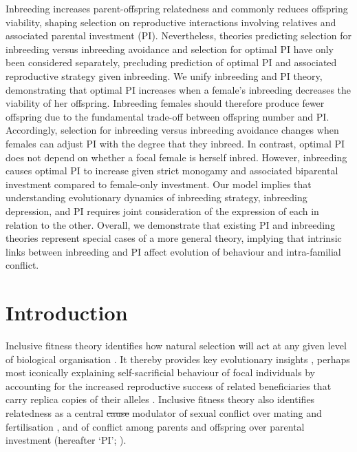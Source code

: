 \documentclass[12pt]{article}
\begin{document}
Inbreeding increases parent-offspring relatedness and commonly reduces offspring viability, shaping selection on reproductive interactions involving relatives and associated parental investment (PI). Nevertheless, theories predicting selection for inbreeding versus inbreeding avoidance and selection for optimal PI have only been considered separately, precluding prediction of optimal PI and associated reproductive strategy given inbreeding. We unify inbreeding and PI theory, demonstrating that optimal PI increases when a female's inbreeding decreases the viability of her offspring. Inbreeding females should therefore produce fewer offspring due to the fundamental trade-off between offspring number and PI. Accordingly, selection for inbreeding versus inbreeding avoidance changes when females can adjust PI with the degree that they inbreed. In contrast, optimal PI does not depend on whether a focal female is herself inbred. However, inbreeding causes optimal PI to increase given strict monogamy and associated biparental investment compared to female-only investment. Our model implies that understanding evolutionary dynamics of inbreeding strategy, inbreeding depression, and PI requires joint consideration of the expression of each in relation to the other. Overall, we demonstrate that existing PI and inbreeding theories represent special cases of a more general theory, implying that intrinsic links between inbreeding and PI affect evolution of behaviour and intra-familial conflict.

\section*{Introduction}

Inclusive fitness theory identifies how natural selection will act at any given level of biological organisation \cite[][]{Grafen2006}. It thereby provides key evolutionary insights \cite[][]{Fisher2013, Bourke2014, Gardner2014, Liao2015}, perhaps most iconically explaining self-sacrificial behaviour of focal individuals by accounting for the increased reproductive success of related beneficiaries that carry replica copies of {\color{blue}their} alleles \cite[][]{Hamilton1964, Hamilton1964a, Frank2013}. Inclusive fitness theory also identifies relatedness as a central {\color{red}\st{cause}} {\color{blue}modulator} of sexual conflict over mating and fertilisation \cite[][]{Parker2006}, and of conflict among parents and offspring over parental investment (hereafter `PI'; \cite[][]{Trivers1972, Trivers1974, Kolliker2015}). 
\end{document}
